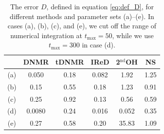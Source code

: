 \documentclass[a4paper, amsfonts, amssymb, amsmath, reprint, showkeys, nofootinbib, twoside, onecolumn,notitlepage]{revtex4-2}
\begin{document}
\begin{table}[ht]
    \centering
    \begin{tabular}{|c||c|c|c|c|c|}
         \hline& DNMR & tDNMR & IReD  & 2$^{\mathrm{nd}}$OH & NS  \\ \hline\hline
         (a)&0.050   &0.18   & 0.082  & 1.92 & 1.25 \\\hline
         (b)&0.15   &0.55   & 0.18   & 1.23  & 0.91\\\hline
         (c)&0.25   &0.92  & 0.13   & 0.56 & 0.59 \\\hline
         (d)&0.0080   &0.24  & 0.016  & 0.052  & 0.35 \\\hline
         (e)&0.27   &0.58  & 0.20   & 35.83  & 1.09 \\\hline
    \end{tabular}
    \caption{The error $D$, defined in equation \eqref{eq:def_D}, for different methods and parameter sets (a)--(e). In cases (a), (b), (c), and (e), we cut off the range of numerical integration at $t_{\mathrm{max}}=50$, while we use $t_{\mathrm{max}}=300$ in case (d).}
    \label{tbl:scores}
\end{table}
\end{document}
